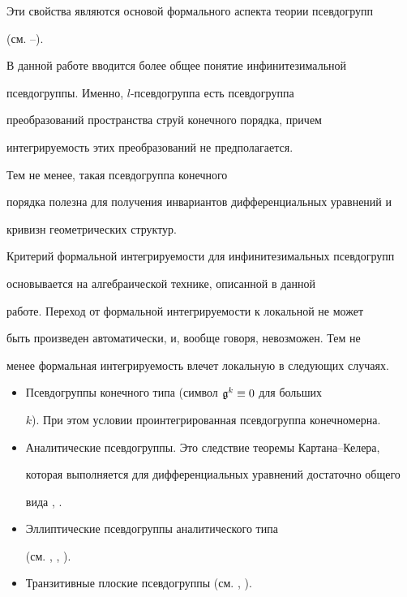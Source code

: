 Эти свойства являются основой формального аспекта теории псевдогрупп


(см. \cite{E}--\cite{SS}).





В данной работе вводится более общее понятие инфинитезимальной


псевдогруппы. Именно, $l$-псевдогруппа есть псевдогруппа


преобразований пространства струй конечного порядка, причем


интегрируемость этих преобразований не предполагается.


Тем не менее, такая псевдогруппа конечного


порядка полезна для получения инвариантов дифференциальных уравнений и


кривизн геометрических структур.





Критерий формальной интегрируемости для инфинитезимальных псевдогрупп


основывается на алгебраической технике, описанной в данной


работе. Переход от формальной интегрируемости к локальной не может


быть произведен автоматически, и, вообще говоря, невозможен. Тем не


менее формальная интегрируемость влечет локальную в следующих случаях.





\begin{itemize}


\item[---]


Псевдогруппы конечного типа (символ ${\frak g}^k \equiv 0$ для больших


$k$). При этом условии проинтегрированная псевдогруппа конечномерна.


\item[---]


Аналитические псевдогруппы. Это следствие теоремы Картана--Келера,


которая выполняется для дифференциальных уравнений достаточно общего


вида \cite{M}, \cite{M1} \cite{KLV}.


\item[---]


Эллиптические псевдогруппы аналитического типа


(см. \cite{M}, \cite{M1}, \cite{S}).


\item[---]


Транзитивные плоские псевдогруппы (см. \cite{BM}, \cite{P}).


\end{itemize}





